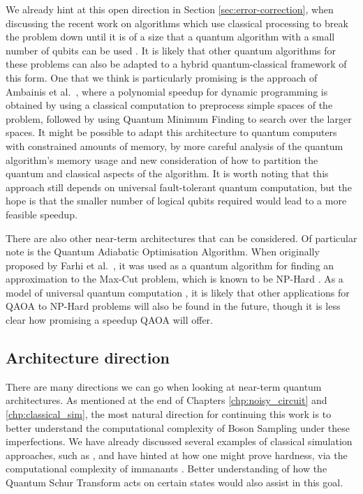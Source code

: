 We already hint at this open direction in Section \ref{sec:error-correction}, when discussing the recent work on algorithms which use classical processing to break the problem down until it is of a size that a quantum algorithm with a small number of qubits can be used \cite{dunjko2018, ge2019}. It is likely that other quantum algorithms for these problems can also be adapted to a hybrid quantum-classical framework of this form. One that we think is particularly promising is the approach of Ambainis et al.~\cite{ambainis2018}, where a polynomial speedup for dynamic programming is obtained by using a classical computation to preprocess simple spaces of the problem, followed by using Quantum Minimum Finding to search over the larger spaces. It might be possible to adapt this architecture to quantum computers with constrained amounts of memory, by more careful analysis of the quantum algorithm's memory usage and new consideration of how to partition the quantum and classical aspects of the algorithm. It is worth noting that this approach still depends on universal fault-tolerant quantum computation, but the hope is that the smaller number of logical qubits required would lead to a more feasible speedup.

There are also other near-term architectures that can be considered. Of particular note is the Quantum Adiabatic Optimisation Algorithm. When originally proposed by Farhi et al.~\cite{farhi2014}, it was used as a quantum algorithm for finding an approximation to the Max-Cut problem, which is known to be NP-Hard \cite{karp1972}. As a model of universal quantum computation \cite{lloyd2018, morales2019}, it is likely that other applications for QAOA to NP-Hard problems will also be found in the future, though it is less clear how promising a speedup QAOA will offer.

\subsection{Architecture direction}

There are many directions we can go when looking at near-term quantum architectures. As mentioned at the end of Chapters \ref{chp:noisy_circuit} and \ref{chp:classical_sim}, the most natural direction for continuing this work is to better understand the computational complexity of Boson Sampling under these imperfections. We have already discussed several examples of classical simulation approaches, such as \cite{renema2018, renema2018loss, garciapatron2017, oszmaniec2018, brod2019}, and have hinted at how one might prove hardness, via the computational complexity of immanants \cite{hartmann1985, barvinok1990, burgisser2000, mertens2013}. Better understanding of how the Quantum Schur Transform acts on certain states would also assist in this goal.

